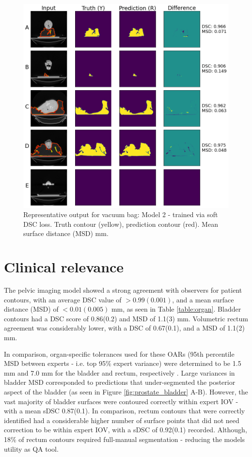 \begin{figure}[H]
	\begin{center}
		\includegraphics[width=1.0\textwidth]{figures/vet_vacbag}
		\caption{Representative output for vacuum bag: Model 2 - trained via soft DSC loss. Truth contour (yellow), prediction contour (red). Mean surface distance (MSD) mm.}
		\label{fig:vet_vacbag}
	\end{center}
\end{figure}

\section{Clinical relevance}
The pelvic imaging model showed a strong agreement with observers for patient contours, with an average DSC value of $>0.99(0.001)$, and a mean surface distance (MSD) of $<0.01(0.005)$ mm, as seen in Table \ref{table:organ}. Bladder contours had a DSC score of 0.86(0.2) and MSD of 1.1(3) mm. Volumetric rectum agreement was considerably lower, with a DSC of 0.67(0.1), and a MSD of 1.1(2) mm.


In comparison, organ-specific tolerances used for these OARs (95th percentile MSD between experts - i.e. top 95\% expert variance) were determined to be 1.5 mm and 7.0 mm
for the bladder and rectum, respectively \cite{Roach_2019, Nikolov_2018}. Large variances in bladder MSD corresponded to predictions that under-segmented the posterior aspect of the bladder (as seen in Figure \ref{fig:prostate_bladder} A-B). However, the vast majority of bladder surfaces were contoured correctly within expert IOV - with a mean sDSC 0.87(0.1). In comparison, rectum contours that were correctly identified had a considerable higher number of surface points that did not need correction to be within expert IOV, with a sDSC of 0.92(0.1) recorded. Although, 18\% of rectum contours required full-manual segmentation - reducing the models utility as QA tool.


